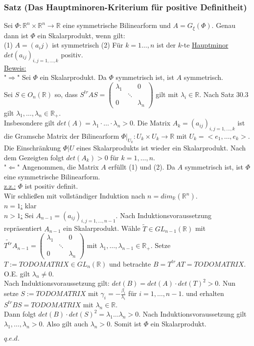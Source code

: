 \documentclass[a4paper]{article}
\newcommand{\ul}{\underline}
\renewcommand{\proof}{\ul{Beweis:}\\}
\renewcommand{\qed}{\begin{flushright}
\ul{\(q.e.d.\)}
\end{flushright}}
\begin{document}
\subsubsection{Satz (Das Hauptminoren-Kriterium für positive Definitheit)}
Sei \(\Phi:\mathbb{R}^n\times\mathbb{R}^n\rightarrow\mathbb{R}\) eine symmetrische Bilinearform und \(A=G_\xi(\Phi)\). Genau dann ist \(\Phi\) ein Skalarprodukt, wenn gilt:\\
(1) \(A=(a_ij)\) ist  symmetrisch
(2) Für \(k=1\dots,n\) ist der \(k\)-te \ul{Hauptminor} \(det(a_{ij})_{i,j=1,\dots,k}\) positiv.\\
\proof
"\(\Rightarrow\)" Sei \(\Phi\) ein Skalarprodukt. Da \(\Phi\) symmetrisch ist, ist \(A\) symmetrisch.\\
Sei \(S\in O_n(\mathbb{R})\) so, dass \(S^{tr}AS=\begin{pmatrix}
\lambda_1 &  & 0\\
&\ddots&\\
0 & & \lambda_n
\end{pmatrix}\) gilt mit \(\lambda_i\in\mathbb{R}\). Nach Satz 30.3 gilt \(\lambda_1,\dots,\lambda_n\in\mathbb{R}_+\).\\
Insbesondere gilt \(det(A)=\lambda_1\cdot\dots\cdot \lambda_n>0\). Die Matrix \(A_k=(a_{ij})_{i,j=1,\dots,k}\) ist die Gramsche Matrix der Bilinearform \(\Phi|_{U_k}:U_k\times U_k\rightarrow\mathbb{R}\) mit \(U_k=<e_1,\dots,e_k>\). Die Einschränkung \(\Phi|U\) eines Skalarprodukts ist wieder ein Skalarprodukt. Nach dem Gezeigten folgt \(det(A_k)>0\) für \(k=1,\dots,n\).\\
"\(\Leftarrow\)" Angenommen, die Matrix \(A\) erfüllt (1) und (2). Da \(A\) symmetrisch ist, ist \(\Phi\) eine symmetrische Bilinearform.\\
\ul{z.z.:} \(\Phi\) ist positiv definit.\\
Wir schließen mit vollständiger Induktion nach \(n=dim_\mathbb{R}(\mathbb{R}^n)\).\\
\ul{\(n=1\):} klar\\
\ul{\(n>1\):} Sei \(A_{n-1}=(a_{ij})_{i,j=1,\dots,n-1}\). Nach Induktionsvoraussetzung repräsentiert \(A_{n-1}\) ein Skalarprodukt. Wähle \(\tilde{T}\in GL_{n-1}(\mathbb{R})\) mit \(\tilde{T^{tr}}A_{n-1}=\begin{pmatrix}
\lambda_1 &  & 0\\
&\ddots&\\
0 & & \lambda_n
\end{pmatrix}\) mit \(\lambda_1,\dots,\lambda_{n-1}\in\mathbb{R}_+\). Setze \(T:=TODO MATRIX\in GL_n(\mathbb{R})\) und betrachte \(B=T^{tr}AT=TODO MATRIX\). O.E. gilt \(\lambda_n\neq 0\).\\
Nach Induktionsvoraussetzung gilt: \(det(B)=det(A)\cdot det(T)^2>0\). Nun setze \(S:= TODO MATRIX\) mit \(\gamma_i=-\frac{\beta_i}{\lambda_i}\) für \(i=1,\dots,n-1\). und erhalten \(S^{tr}BS=TODO MATRIX\) mit \(\lambda_n\in\mathbb{R}\).\\
Dann folgt \(det(B)\cdot det(S)^2=\lambda_1\dots\lambda_n>0\). Nach Induktionsvoraussetzung gilt \(\lambda_1,\dots,\lambda_n>0\). Also gilt auch \(\lambda_n>0\). Somit ist \(\Phi\) ein Skalarprodukt.
\qed
\end{document}
